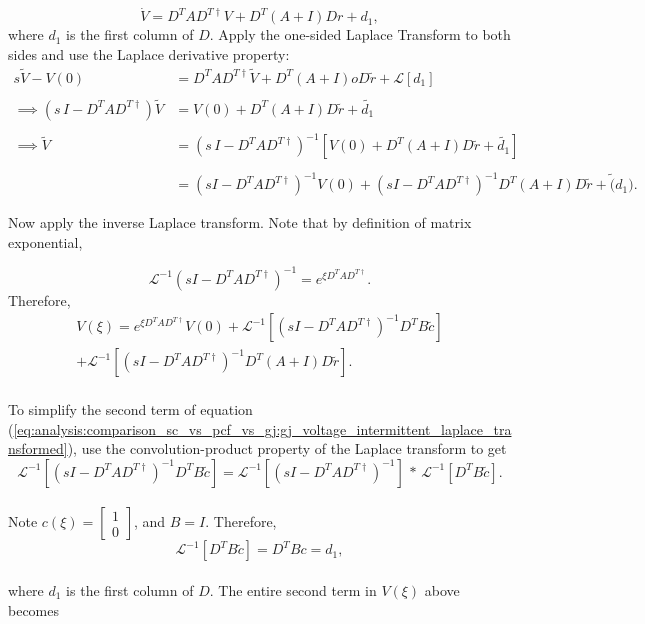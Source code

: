\begin{enumerate}
$$
	\dot{V} 
	=
	D^T A D^{T \dagger} V
	+ 
	D^T 
	\left(
		A + I
	\right)
	D r
	+
	d_1,
$$
where $d_1$ is the first column of $D$. 
Apply the one-sided Laplace Transform to both sides and use the Laplace derivative property:
\begin{align*}
	s \tilde{V} - V(0)
	&=
	D^T A D^{T \dagger} \tilde{V}
	+
	D^T 
	\left(
		A + I
	\right)o
	D \tilde{r}
	+
	\mathcal{L}\left[d_1\right]
	\\
	\\
	\implies
	\left(
	s \, I - D^T A D^{T \dagger} 
	\right)
	\tilde{V}
	&=
	V(0)
	+
		D^T 
	\left(
		A + I
	\right)
	D \tilde{r}
	+
	\tilde{d_1}	
	\\
	\\
	\implies 
	\tilde{V}
	&= 
	\left(
	s \, I - D^T A D^{T \dagger} 
	\right)^{-1}
	\left[
		V(0)
		+
		D^T 
		\left(
			A + I
		\right)
		D \tilde{r}
		+
		\tilde{d_1}	
	\right]
	\\
	\\
	&= 
	\left(
		sI - D^T A D^{T \dagger}
	\right)^{-1}
	V(0)
	+ 
		\left(
		sI - D^T A D^{T \dagger}
	\right)^{-1}
	D^T 
	\left(
		A + I
	\right)	
	D \tilde{r}
	+
	\tilde(d_1).
\end{align*}

Now apply the inverse Laplace transform. Note that by definition of matrix exponential, 

$$
	\mathcal{L}^{-1} 
	\left(
		sI - D^T A D^{T \dagger}
	\right)^{-1}
	= e^{\xi D^T A D^{T \dagger}}.
$$
Therefore, 
\begin{multline}
\label{eq:analysis:comparison_sc_vs_pcf_vs_gj:gj_voltage_intermittent_laplace_transformed}
	V(\xi)
	=
	e^{\xi D^T A D^{T \dagger}} V(0)
	+
	\mathcal{L}^{-1}
	\left[
		\left(
			sI - D^T A D^{T \dagger}
		\right)^{-1}
		D^T B \tilde{c}
	\right]
	\\
		+ 
	\mathcal{L}^{-1}
	\left[
		\left(
			sI - D^T A D^{T \dagger}
		\right)^{-1}
		D^T 
		\left(
			A + I
		\right)	
		D \tilde{r}
	\right].
\end{multline}
\\
To simplify the second term of equation (\ref{eq:analysis:comparison_sc_vs_pcf_vs_gj:gj_voltage_intermittent_laplace_transformed}), use the convolution-product property of the Laplace transform to get
\\
$$
	\mathcal{L}^{-1}
	\left[
		\left(
			sI - D^T A D^{T \dagger}
		\right)^{-1}
		D^T B \tilde{c}
	\right]
	=
	\mathcal{L}^{-1}
	\left[
			\left(
			sI - D^T A D^{T \dagger}
		\right)^{-1}		
	\right]
	\,	* \, 
		\mathcal{L}^{-1}
	\left[
			D^T B \tilde{c}
	\right].
$$
\\
Note $c(\xi) = \begin{bmatrix}
1 \\ 0
\end{bmatrix}$, and $B = I$. Therefore,
\\
$$
		\mathcal{L}^{-1}
	\left[
			D^T B \tilde{c}
	\right] = D^T B c = d_1,
$$\\
where $d_1$ is the first column of $D$.
The entire second term in  $V(\xi)$ above becomes


\end{enumerate}
